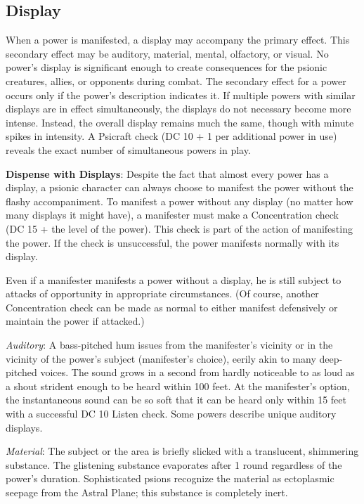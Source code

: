 \subsection{Display}
When a power is manifested, a display may accompany the primary effect. This secondary effect may be auditory, material, mental, olfactory, or visual. No power's display is significant enough to create consequences for the psionic creatures, allies, or opponents during combat. The secondary effect for a power occurs only if the power's description indicates it. If multiple powers with similar displays are in effect simultaneously, the displays do not necessary become more intense. Instead, the overall display remains much the same, though with minute spikes in intensity. A Psicraft check (DC 10 + 1 per additional power in use) reveals the exact number of simultaneous powers in play.

\textbf{Dispense with Displays}: Despite the fact that almost every power has a display, a psionic character can always choose to manifest the power without the flashy accompaniment. To manifest a power without any display (no matter how many displays it might have), a manifester must make a Concentration check (DC 15 + the level of the power). This check is part of the action of manifesting the power. If the check is unsuccessful, the power manifests normally with its display.

Even if a manifester manifests a power without a display, he is still subject to attacks of opportunity in appropriate circumstances. (Of course, another Concentration check can be made as normal to either manifest defensively or maintain the power if attacked.)

\textit{Auditory}: A bass-pitched hum issues from the manifester's vicinity or in the vicinity of the power's subject (manifester's choice), eerily akin to many deep-pitched voices. The sound grows in a second from hardly noticeable to as loud as a shout strident enough to be heard within 100 feet. At the manifester's option, the instantaneous sound can be so soft that it can be heard only within 15 feet with a successful DC 10 Listen check. Some powers describe unique auditory displays.

\textit{Material}: The subject or the area is briefly slicked with a translucent, shimmering substance. The glistening substance evaporates after 1 round regardless of the power's duration. Sophisticated psions recognize the material as ectoplasmic seepage from the Astral Plane; this substance is completely inert.

